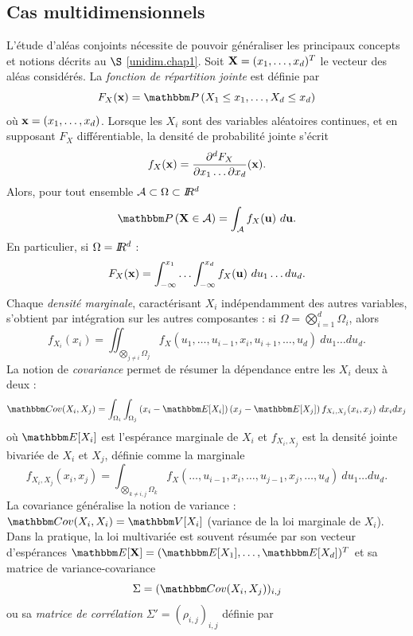 \subsection{Cas multidimensionnels}\label{axiomes.multidim}

L'\'etude d'al\'eas conjoints n\'ecessite de pouvoir g\'en\'eraliser les principaux concepts et notions d\'ecrits au $\S$ \ref{unidim.chap1}. Soit ${\bf X}=(x_1,\ldots,x_d)^T$ le vecteur des al\'eas consid\'er\'es. La {\it fonction de r\'epartition jointe} est d\'efinie par 
$$
F_X({\bf x}) = \Pm\left(X_1\leq x_1,\ldots,X_d\leq x_d\right)
$$
o\`u ${\bf x}=(x_1,\ldots,x_d)$. Lorsque les $X_i$ sont des variables al\'eatoires continues, et en supposant $F_X$ diff\'erentiable, la densit\'e de probabilit\'e jointe s'\'ecrit
$$
f_X({\bf x}) = \frac{\partial^d F_X}{\partial x_1 \ldots \partial x_d}({\bf x}).
$$
Alors, pour tout ensemble ${\cal{A}}\subset\Omega\subset I\!\!R^d$
$$
\Pm\left({\bf X}\in{\cal{A}}\right) = \int_{\cal{A}} f_X({\bf u}) \ d{\bf u}.
$$
En particulier, si  $\Omega=I\!\!R^d$ :
$$
F_X({\bf x}) = \int_{-\infty}^{x_1} \ldots \int_{-\infty}^{x_d} f_X({\bf u}) \ du_1 \ldots du_d.
$$
Chaque {\it densit\'e marginale}, caract\'erisant $X_i$ ind\'ependamment des autres variables, s'obtient par int\'egration sur les autres composantes : si $\Omega=\bigotimes_{i=1}^d \Omega_i$, alors 
$$
f_{X_i}(x_i) = \iint_{\bigotimes\limits_{j\neq i} \Omega_j} f_X(u_1,\ldots,u_{i-1},x_i,u_{i+1},\ldots,u_d)  \ du_1 \ldots du_d.
$$
La notion de {\it covariance}  permet de r\'esumer la d\'ependance entre les $X_i$ deux \`a deux :
$$
\Cov(X_i,X_j) =  \int_{\Omega_i} \int_{\Omega_j} \left(x_i-\E[X_i]\right)\left(x_j-\E[X_j]\right)  f_{X_i,X_j}(x_i,x_j) \ dx_i dx_j
$$ 
o\`u $\E[X_i]$ est l'esp\'erance marginale de $X_i$ et $f_{X_i,X_j}$ est la densit\'e jointe bivari\'ee de $X_i$ et $X_j$, d\'efinie comme la marginale
$$
f_{X_i,X_j}(x_i,x_j) = \int_{\bigotimes\limits_{k\neq i,j} \Omega_k} f_X(\ldots,u_{i-1},x_i,\ldots,u_{j-1},x_j,\ldots,u_d)  \ du_1 \ldots du_d.
$$
La covariance g\'en\'eralise la notion de variance : $\Cov(X_i,X_i)=\Var[X_i]$ (variance de la loi marginale de $X_i$). 
Dans la pratique, la loi multivari\'ee est souvent r\'esum\'ee par son vecteur d'esp\'erances $\E[{\bf X}]=(\E[X_1],\ldots,\E[X_d])^T$ et sa matrice de variance-covariance 
$$
\Sigma=(\Cov(X_i,X_j))_{i,j}
$$ 
ou sa {\it matrice de corr\'elation}  $\Sigma'=(\rho_{i,j})_{i,j}$ d\'efinie par
